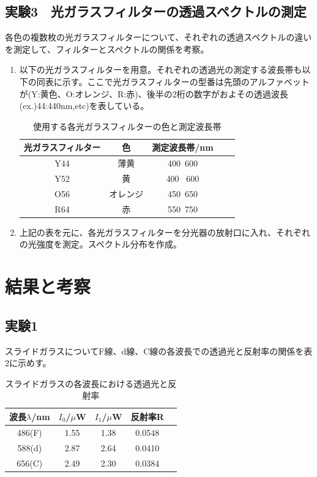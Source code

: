 \documentclass[11pt,a4j]{jsarticle}
\begin{document}
  \subsection{実験3　光ガラスフィルターの透過スペクトルの測定}
  各色の複数枚の光ガラスフィルターについて、それぞれの透過スペクトルの違いを測定して、フィルターとスペクトルの関係を考察。
   \begin{enumerate}
   \item 以下の光ガラスフィルターを用意。それぞれの透過光の測定する波長帯も以下の同表に示す。ここで光ガラスフィルターの型番は先頭のアルファベットが(Y:黄色、O:オレンジ、R:赤)、後半の2桁の数字がおよその透過波長(ex.)44:440nm,etc)を表している。
   \begin{table}[htb]
  \begin{center}
    \caption{使用する各光ガラスフィルターの色と測定波長帯}
    \begin{tabular}{ccccc} \toprule
光ガラスフィルター & 色 & 測定波長帯/nm \\ \midrule
Y44 & 薄黄 & 400~600 \\
Y52 & 黄 & 400 ~600 \\
O56 & オレンジ & 450~650 \\
R64 & 赤 & 550~750 \\ \bottomrule
    \end{tabular}
    \label{tab:price}
  \end{center}
\end{table}
  \item 上記の表を元に、各光ガラスフィルターを分光器の放射口に入れ、それぞれの光強度を測定。スペクトル分布を作成。
  \end{enumerate}
  
  
 \section{結果と考察}
  \subsection{実験1}
  
  スライドガラスについてF線、d線、C線の各波長での透過光と反射率の関係を表2に示めす。
  
  \begin{table}[htb]
  \begin{center}
    \caption{スライドガラスの各波長における透過光と反射率}
    \begin{tabular}{ccccc} \toprule
波長$\lambda$/nm & $I_0$/$\mu$W & $I_1$/$\mu$W & 反射率R \\ \midrule
486(F) & 1.55 & 1.38 & 0.0548 \\
588(d) & 2.87 & 2.64 & 0.0410 \\
656(C) & 2.49 & 2.30 & 0.0384 \\ \bottomrule
    \end{tabular}
    \label{tab:price}
  \end{center}
\end{table}
\end{document}
